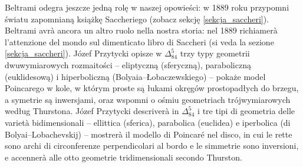 
Beltrami odegra jeszcze jedną rolę w naszej opowieści: w 1889 roku przypomni światu zapomnianą książkę Saccheriego (zobacz sekcję \ref{sekcja_saccheri}). %
Beltrami avrà ancora un altro ruolo nella nostra storia: nel 1889 richiamerà l'attenzione del mondo sul dimenticato libro di Saccheri (si veda la sezione \ref{sekcja_saccheri}). %
Józef Przytycki opisze w $\Delta_{84}^{5}$ trzy typy geometrii dwuwymiarowych rozmaitości -- eliptyczną (sferyczną), paraboliczną (euklidesową) i hiperboliczną (Bolyaia--Łobaczewskiego) -- pokaże model Poincarego w kole, w którym proste są łukami okręgów prostopadłych do brzegu, a symetrie są inwersjami, oraz wspomni o ośmiu geometriach trójwymiarowych według Thurstona. %
Józef Przytycki descriverà in $\Delta_{84}^{5}$ i tre tipi di geometria delle varietà bidimensionali -- ellittica (sferica), parabolica (euclidea) e iperbolica (di Bolyai--Lobachevskij) -- mostrerà il modello di Poincaré nel disco, in cui le rette sono archi di circonferenze perpendicolari al bordo e le simmetrie sono inversioni, e accennerà alle otto geometrie tridimensionali secondo Thurston. %

